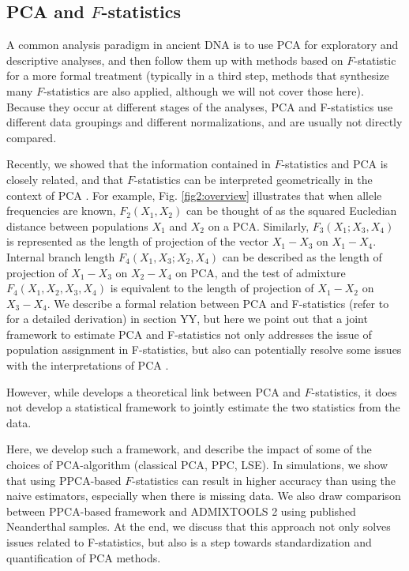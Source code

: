 \documentclass[12pt, letterpaper]{article}
\begin{document}
\subsection{PCA and $F$-statistics}

A common analysis paradigm in ancient DNA is to use PCA for exploratory and descriptive analyses, and then follow them up with methods based on $F$-statistic for a more formal treatment (typically in a third step, methods that synthesize many $F$-statistics are also applied, although we will not cover those here). Because they occur at different stages of the analyses, PCA and F-statistics use different data groupings and different normalizations, and are usually not directly compared. 

Recently, we showed that the information contained in $F$-statistics and PCA is closely related, and that $F$-statistics can be interpreted geometrically in the context of PCA \cite{peter_geometric_2022}. For example, Fig. \ref{fig2:overview} illustrates that when allele frequencies are known,  $F_2(X_1,X_2)$ can be thought of as the squared Eucledian distance between populations $X_1$ and $X_2$ on a PCA. Similarly, $F_3(X_1;X_3,X_4)$ is represented as the length of projection of the vector $X_1-X_3$ on $X_1-X_4$. Internal branch length $F_4(X_1,X_3;X_2,X_4)$ can be described as the length of projection of $X_1-X_3$ on $X_2-X_4$ on PCA, and the test of admixture $F_4(X_1,X_2,X_3,X_4)$ is equivalent to the length of projection of $X_1-X_2$ on $X_3-X_4$. We describe a formal relation between PCA and F-statistics (refer to \cite{peter_geometric_2022} for a detailed derivation) in section YY, but here we point out that a joint framework to estimate PCA and F-statistics not only addresses the issue of population assignment in F-statistics, but also can potentially resolve some issues with the interpretations of PCA \cite{novembre_genes_2008, noauthor_cavalli-sforza_nodate, degiorgio_geographic_2013, francois_principal_2010}. 

However, while \cite{peter_geometric_2022} develops a theoretical link between PCA and $F$-statistics, it does not develop a statistical framework to jointly estimate the two statistics from the data. 

Here, we develop such a framework, and describe the impact of some of the choices of PCA-algorithm (classical PCA, PPC, LSE). In simulations, we show that using PPCA-based $F$-statistics can result in higher accuracy than using the naive estimators, especially when there is missing data. We also draw comparison between PPCA-based framework and ADMIXTOOLS 2 using published Neanderthal samples. At the end, we discuss that this approach not only solves issues related to F-statistics, but also is a step towards standardization and quantification of PCA methods.
\end{document}
